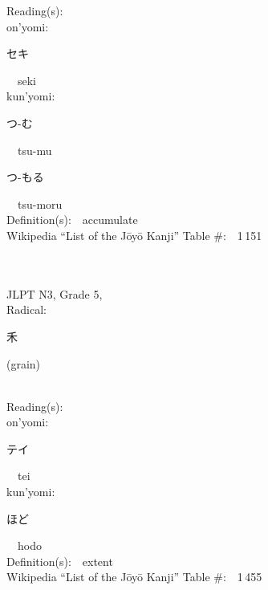 \begin{multicols}{2}
Reading(s):\ \ \\
{\hspace*{1em}}on'yomi:\ \ \\
{\hspace*{2em}}{\begin{CJK}{UTF8}{min} セキ \end{CJK}}\ \ seki\ \ \\
{\hspace*{1em}}kun'yomi:\ \ \\
{\hspace*{2em}}{\begin{CJK}{UTF8}{min} つ-む \end{CJK}}\ \ tsu-mu\ \ \\
{\hspace*{2em}}{\begin{CJK}{UTF8}{min} つ-もる \end{CJK}}\ \ tsu-moru\ \ \\
Definition(s):\ \ accumulate \\
Wikipedia ``List of the J\=oy\=o Kanji'' Table \#:\ \ 1\,151 \\
\ \ \\
{\fontsize{34pt}{40pt}  }\ \ \\  %
{JLPT N3, Grade 5, \\Radical:\ \ {\begin{CJK}{UTF8}{min} 禾 \end{CJK}} (grain) } \\
Reading(s):\ \ \\
{\hspace*{1em}}on'yomi:\ \ \\
{\hspace*{2em}}{\begin{CJK}{UTF8}{min} テイ \end{CJK}}\ \ tei\ \ \\
{\hspace*{1em}}kun'yomi:\ \ \\
{\hspace*{2em}}{\begin{CJK}{UTF8}{min} ほど \end{CJK}}\ \ hodo\ \ \\
Definition(s):\ \ extent \\
Wikipedia ``List of the J\=oy\=o Kanji'' Table \#:\ \ 1\,455 \\

\end{multicols}
